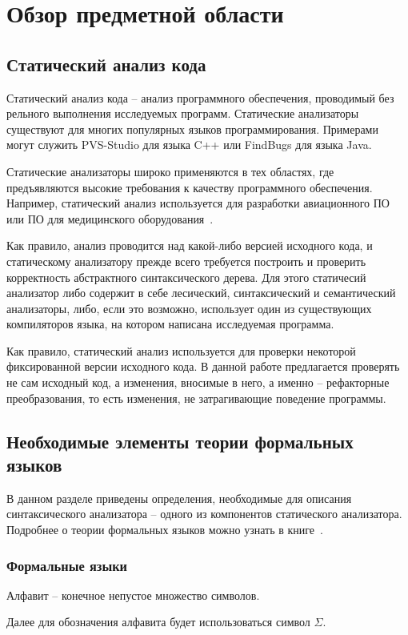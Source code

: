 \chapter{Обзор предметной области}
\section{Статический анализ кода}
Статический анализ кода -- анализ программного обеспечения, проводимый без рельного выполнения исследуемых программ.
Статические анализаторы существуют для многих популярных языков программирования.
Примерами могут служить PVS-Studio для языка C++ или FindBugs для языка Java.

Статические анализаторы широко применяются в тех областях, где предъявляются высокие требования к качеству программного обеспечения.
Например, статический анализ используется для разработки авиационного ПО~\cite{static-air} или ПО для медицинского оборудования~\cite{static-med}.


Как правило, анализ проводится над какой-либо версией исходного кода,
и статическому анализатору прежде всего требуется построить и проверить корректность абстрактного синтаксического дерева.
Для этого статичесий анализатор либо содержит в себе лесический, синтаксический и семантический анализаторы,
либо, если это возможно, использует один из существующих компиляторов языка, на котором написана исследуемая программа.

Как правило, статический анализ используется для проверки некоторой фиксированной версии исходного кода.
В данной работе предлагается проверять не сам исходный код, а изменения, вносимые в него,
а именно -- рефакторные преобразования, то есть изменения, не затрагивающие поведение программы.
\section{Необходимые элементы теории формальных языков}
В данном разделе приведены определения, необходимые для описания синтаксического анализатора -- одного из компонентов статического анализатора.
Подробнее о теории формальных языков можно узнать в книге~\cite{hmu}.
\subsection{Формальные языки}
\begin{definition}
Алфавит -- конечное непустое множество символов.
\end{definition}
Далее для обозначения алфавита будет использоваться символ $\Sigma$.

